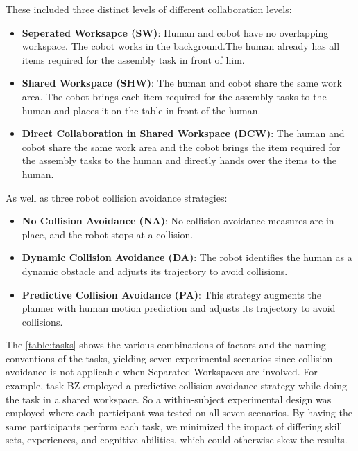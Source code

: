 These included three distinct levels of different collaboration levels:

\begin{itemize}
    \item \textbf{Seperated Worksapce (SW)}:
    Human and cobot have no overlapping workspace. The cobot works in the background.The human already has all items required for the assembly task in front of him.
    
    \item \textbf{Shared Workspace (SHW)}:
    The human and cobot share the same work area. The cobot brings each item required for the assembly tasks to the human and places it on the table in front of the human.
    
    \item \textbf{Direct Collaboration in Shared Workspace (DCW)}:
    The human and cobot share the same work area and the cobot brings the item required for the assembly tasks to the human and  directly hands over the items to the human.
\end{itemize}

As well as three robot collision avoidance strategies:

\begin{itemize}
    \item \textbf{No Collision Avoidance (NA)}:
    No collision avoidance measures are in place, and the robot stops at a collision.
    
    \item \textbf{Dynamic Collision Avoidance (DA)}:
    The robot identifies the human as a dynamic obstacle and adjusts its trajectory to avoid collisions.
    
    \item \textbf{Predictive Collision Avoidance (PA)}:
    This strategy augments the planner with human motion prediction and adjusts its trajectory to avoid collisions.
\end{itemize}

The \autoref{table:tasks} shows the various combinations of factors and the naming conventions of the tasks, yielding seven experimental scenarios since collision avoidance is not applicable when Separated Workspaces are involved. For example, task BZ employed a predictive collision avoidance strategy while doing the task in a shared workspace. So a within-subject experimental design was employed where each participant was tested on all seven scenarios. By having the same participants perform each task, we minimized the impact of differing skill sets, experiences, and cognitive abilities, which could otherwise skew the results.

